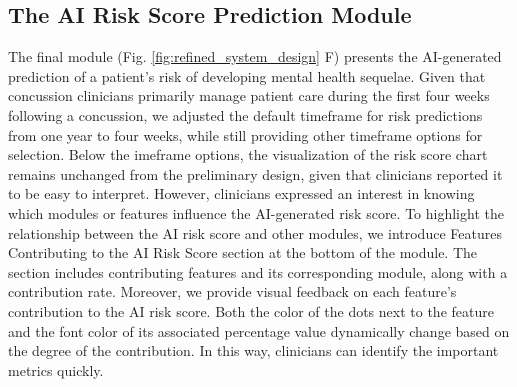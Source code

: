 \subsection{The AI Risk Score Prediction Module}
The final module (Fig. \ref{fig:refined_system_design} F) presents the AI-generated prediction of a patient’s risk of developing mental health sequelae. 
Given that concussion clinicians primarily manage patient care during the first four weeks following a concussion, we adjusted the default timeframe for risk predictions from one year to four weeks, while still providing other timeframe options for selection.
Below the imeframe options, the visualization of the risk score chart remains unchanged from the preliminary design, given that clinicians reported it to be easy to interpret. 
However, clinicians expressed an interest in knowing which modules or features influence the AI-generated risk score.
To highlight the relationship between the AI risk score and other modules, we introduce Features Contributing to the AI Risk Score section at the bottom of the module.
The section includes contributing features and its corresponding module, along with a contribution rate.
Moreover, we provide visual feedback on each feature's contribution to the AI risk score. 
Both the color of the dots next to the feature and the font color of its associated percentage value dynamically change based on the degree of the contribution. 
In this way, clinicians can identify the important metrics quickly.




